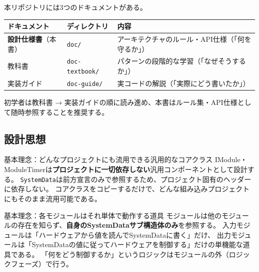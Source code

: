 本リポジトリには3つのドキュメントがある。

\begin{tabularx}{\textwidth}{l l X}
\toprule
\textbf{ドキュメント} & \textbf{ディレクトリ} & \textbf{内容} \\
\midrule
\textbf{設計仕様書}（本書） & \texttt{doc/} & アーキテクチャのルール・API仕様（「何を守るか」） \\
教科書 & \texttt{doc-textbook/} & パターンの段階的な学習（「なぜそうするか」） \\
実装ガイド & \texttt{doc-guide/} & 実コードの解説（「実際にどう書いたか」） \\
\bottomrule
\end{tabularx}

\vspace{2mm}
初学者は教科書 → 実装ガイドの順に読み進め、本書はルール集・API仕様として随時参照することを推奨する。

\subsection{設計思想}

\begin{funcblock}{基本理念：どんなプロジェクトにも流用できる汎用的なコアクラス}
IModule・ModuleTimerは\textbf{プロジェクトに一切依存しない}汎用コンポーネントとして設計する。
\texttt{SystemData}は前方宣言のみで参照するため、プロジェクト固有のヘッダーに依存しない。
コアクラスをコピーするだけで、どんな組み込みプロジェクトにもそのまま流用可能である。
\end{funcblock}

\begin{funcblock}{基本理念：各モジュールはそれ単体で動作する道具}
モジュールは他のモジュールの存在を知らず、\textbf{自身のSystemDataサブ構造体のみ}を参照する。
入力モジュールは「ハードウェアから値を読んでSystemDataに書く」だけ、
出力モジュールは「SystemDataの値に従ってハードウェアを制御する」だけの単機能な道具である。
「何をどう制御するか」というロジックはモジュールの外（ロジックフェーズ）で行う。
\end{funcblock}

